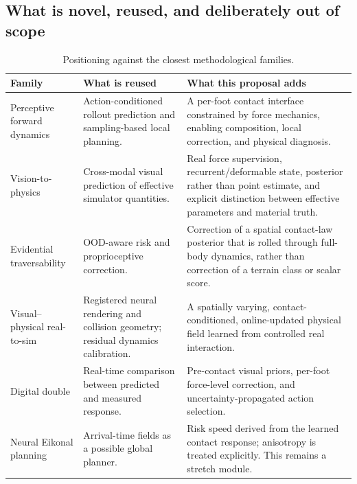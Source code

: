 \subsection{What is novel, reused, and deliberately out of scope}

\begin{table}[ht]
\centering
\caption{Positioning against the closest methodological families.}
\label{tab:positioning}
\small
\begin{tabularx}{\textwidth}{@{}L{31mm}Y Y@{}}
\toprule
\textbf{Family} & \textbf{What is reused} & \textbf{What this proposal adds}\\
\midrule
Perceptive forward dynamics \citep{roth2025perceptive,kim2022forward} & Action-conditioned rollout prediction and sampling-based local planning. & A per-foot contact interface constrained by force mechanics, enabling composition, local correction, and physical diagnosis.\\
Vision-to-physics \citep{chen2024terrain} & Cross-modal visual prediction of effective simulator quantities. & Real force supervision, recurrent/deformable state, posterior rather than point estimate, and explicit distinction between effective parameters and material truth.\\
Evidential traversability \citep{cai2024pietra,ren2024topnav} & OOD-aware risk and proprioceptive correction. & Correction of a spatial contact-law posterior that is rolled through full-body dynamics, rather than correction of a terrain class or scalar score.\\
Visual--physical real-to-sim \citep{chen2026quadverse,escontrela2025gaussgym,han2025re3sim} & Registered neural rendering and collision geometry; residual dynamics calibration. & A spatially varying, contact-conditioned, online-updated physical field learned from controlled real interaction.\\
Digital double \citep{haddeler2022digital} & Real-time comparison between predicted and measured response. & Pre-contact visual priors, per-foot force-level correction, and uncertainty-propagated action selection.\\
Neural Eikonal planning \citep{ni2023ntfields,liu2025active} & Arrival-time fields as a possible global planner. & Risk speed derived from the learned contact response; anisotropy is treated explicitly. This remains a stretch module.\\
\bottomrule
\end{tabularx}
\end{table}

